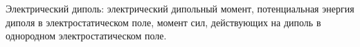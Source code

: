 \documentclass[__main__.tex]{subfiles}
\begin{document}
Электрический диполь: электрический дипольный момент, потенциальная энергия диполя в электростатическом поле, момент сил, действующих на диполь в однородном электростатическом поле.\\ 

\end{document}
